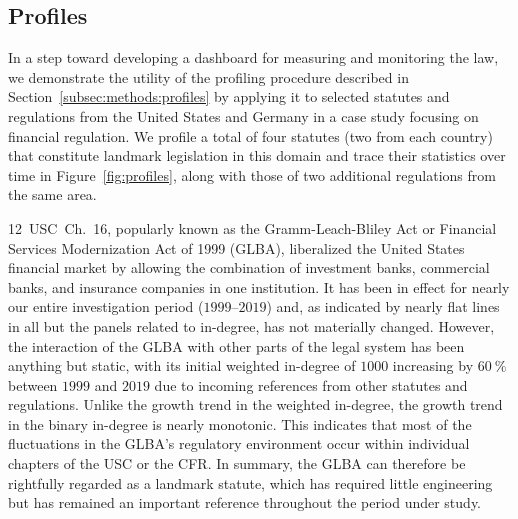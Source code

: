 \documentclass[utf8,sort&compress,table,hidelinks]{frontiersFPHY} %
\begin{document}
\vspace*{6pt}
\subsection{Profiles}
\label{subsec:results:profiles}

In a step toward developing a dashboard for measuring and monitoring the law, 
we demonstrate the utility of the profiling procedure described in Section~\ref{subsec:methods:profiles} by applying it to selected statutes and regulations from the United States and Germany in a case study focusing on financial regulation. 
We profile a total of four statutes (two from each country) that constitute landmark legislation in this domain and trace their statistics over time in Figure~\ref{fig:profiles}, 
along with those of two additional regulations from the same area.



12~USC~Ch.~16, popularly known as the Gramm-Leach-Bliley Act or Financial Services Modernization Act of 1999 (GLBA), liberalized the United States financial market by allowing the combination of investment banks, commercial banks, and insurance companies in one institution. 
It has been in effect for nearly our entire investigation period ($1999$--$2019$) and, as indicated by nearly flat lines in all but the panels related to in-degree, has not materially changed.
However, the interaction of the GLBA with other parts of the legal system has been anything but static, with its initial weighted in-degree of $1000$ increasing by $60~\%$ between $1999$ and $2019$ due to incoming references from other statutes and regulations.
Unlike the growth trend in the weighted in-degree, the growth trend in the binary in-degree is nearly monotonic. 
This indicates that most of the fluctuations in the GLBA's regulatory environment occur within individual chapters of the USC or the CFR.
In summary, the GLBA can therefore be rightfully regarded as a landmark statute, which has required little engineering but has remained an important reference throughout the period under study.
\end{document}
